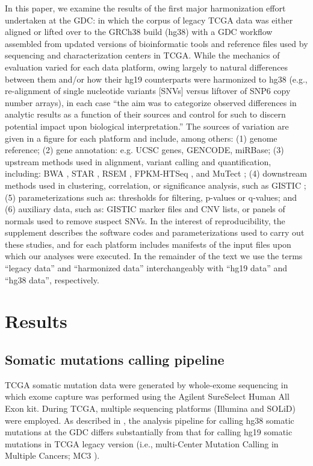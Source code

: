 In this paper, we examine the results of the first major harmonization effort undertaken at the GDC: in which the corpus of legacy TCGA data was either aligned or lifted over to the GRCh38 build (hg38) with a GDC workflow assembled from updated versions of bioinformatic tools and reference files used by sequencing and characterization centers in TCGA. While the mechanics of evaluation varied for each data platform, owing largely to natural differences between them and/or how their hg19 counterparts were harmonized to hg38 (e.g., re-alignment of single nucleotide variants [SNVs] versus liftover of SNP6 copy number arrays), in each case \enquote{the aim was to categorize observed differences in analytic results as a function of their sources and control for such to discern potential impact upon biological interpretation.} The sources of variation are given in a figure for each platform and include, among others: (1) genome reference; (2) gene annotation: e.g. UCSC genes, GENCODE, miRBase; (3) upstream methods used in alignment, variant calling and quantification, including: BWA \cite{lih_durbinr:BWAShortRead2009}, STAR \cite{dobina_gingerastr:STARUltrafast2013}, RSEM \cite{lib_deweycn:RSEMAccurate2011}, FPKM-HTSeq \cite{anderss_huberw:HTSeqPython2015}, and MuTect \cite{cibulskisk_getzg:SensitiveDetection2013}; (4) downstream methods used in clustering, correlation, or significance analysis, such as GISTIC \cite{mermelch_getzg:GISTIC2Facilitates2011}; (5) parameterizations such as: thresholds for filtering, p-values or q-values; and (6) auxiliary data, such as: GISTIC marker files and CNV lists, or panels of normals used to remove suspect SNVs. In the interest of reproducibility, the supplement describes the software codes and parameterizations used to carry out these studies, and for each platform includes manifests of the input files upon which our analyses were executed. In the remainder of the text we use the terms ``legacy data'' and ``harmonized data'' interchangeably with ``hg19 data'' and ``hg38 data'', respectively.


\section{Results}

\subsection{Somatic mutations calling pipeline}
TCGA somatic mutation data were generated by whole-exome sequencing in which exome capture was performed using the Agilent SureSelect Human All Exon kit. During TCGA, multiple sequencing platforms (Illumina and SOLiD) were employed. As described in , the analysis pipeline for calling hg38 somatic mutations at the GDC differs substantially from that for calling hg19 somatic mutations in TCGA legacy version (i.e., multi-Center Mutation Calling in Multiple Cancers; MC3 \cite{ellrottk_tcga:MC3MutationCalling2018}).

